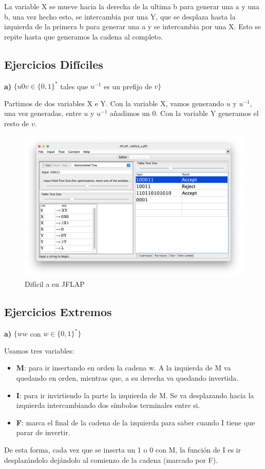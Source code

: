 La variable X se mueve hacia la derecha de la ultima b para generar una a y una b, una vez hecho esto, se intercambia por una Y, que se desplaza hasta la izquierda de la primera b para generar una a y se intercambia por una X. Esto se repite hasta que generamos la cadena al completo.

\subsection{Ejercicios Difíciles}

\textbf{a)}  $\{ u0v \in \{0,1\}^{\ast} $ tales que $u^{-1}$ es un prefijo de $v\}$

Partimos de dos variables X e Y. Con la variable X, vamos generando $u$ y $u^{-1}$, una vez generadas, entre $u$ y $u^{-1}$ añadimos un 0. Con la variable Y generamos el resto de $v$.


\begin{figure}[H] 
	\centering
	\includegraphics[scale=0.35]{../practica_1/images/dificil_a.png} 
	\caption{Difícil a en JFLAP} 
    \label{fig:dificil_a}
\end{figure}

\subsection{Ejercicios Extremos}

\textbf{a)}  $\{ ww$ con $w \in \{0,1\}^{\ast}\}$

Usamos tres variables:
\begin{itemize}
\item \textbf{M}: para ir insertando en orden la cadena w. A la izquierda de M va quedando en orden, mientras que, a su derecha va quedando invertida.
\item \textbf{I}: para ir invirtiendo la parte la izquierda de M. Se va desplazando hacia la izquierda intercambiando dos símbolos terminales entre si.
\item \textbf{F}: marca el final de la cadena de la izquierda para saber cuando I tiene que parar de invertir. 
\end{itemize}
De esta forma, cada vez que se inserta un 1 o 0 con M, la función de I es ir desplazándolo dejándolo al comienzo de la cadena (marcado por F).

